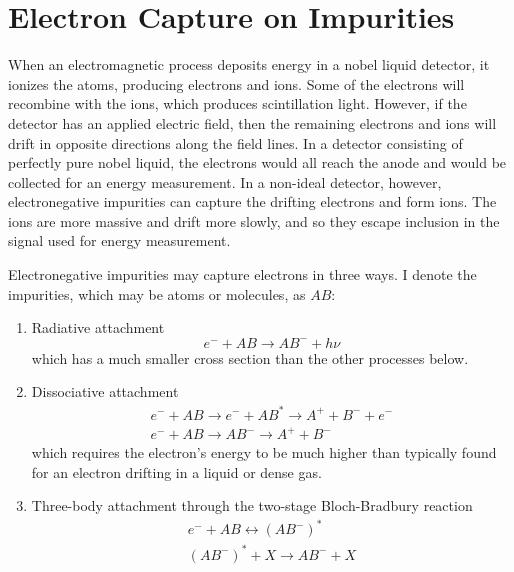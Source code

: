 \documentclass[herrin-thesis.tex]{subfiles}
\begin{document}
\section{Electron Capture on Impurities}
When an electromagnetic process deposits energy in a nobel liquid detector, it ionizes the atoms, producing electrons and ions. Some of the electrons will recombine with the ions, which produces scintillation light. However, if the detector has an applied electric field, then the remaining electrons and ions will drift in opposite directions along the field lines. In a detector consisting of perfectly pure nobel liquid, the electrons would all reach the anode and would be collected for an energy measurement. In a non-ideal detector, however, electronegative impurities can capture the drifting electrons and form ions. The ions are more massive and drift more slowly, and so they escape inclusion in the signal used for energy measurement.

Electronegative impurities may capture electrons in three ways\cite{Aprile:2006fk}. I denote the impurities, which may be atoms or molecules, as \(AB\):
\begin{enumerate}
\item Radiative attachment
\begin{equation}
e^{-} + AB \rightarrow AB^{-} + h \nu
\end{equation}
which has a much smaller cross section than the other processes below.
\item Dissociative attachment
\begin{equation}
\begin{split}
e^{-} + AB \rightarrow e^{-} + AB^{*} \rightarrow A^{+} + B^{-} + e^{-} \\
e^{-} + AB \rightarrow AB^{-} \rightarrow A^{+} + B^{-}
\end{split}
\end{equation}
which requires the electron's energy to be much higher than typically found for an electron drifting in a liquid or dense gas.
\item Three-body attachment through the two-stage Bloch-Bradbury reaction
\begin{equation}
\begin{split}
e^{-} + AB \leftrightarrow (AB^{-})^{*} \\
(AB^{-})^{*} + X \rightarrow AB^{-} + X
\end{split}
\label{eq:3bodyattachment}
\end{equation}
\end{enumerate}
\end{document}
